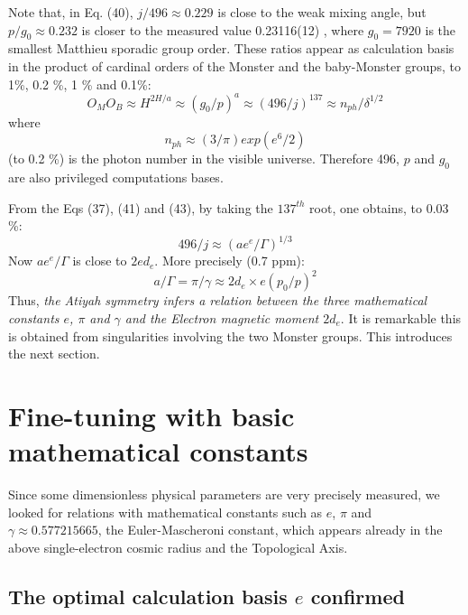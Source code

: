 \documentclass[twoside,draft]{article}
\begin{document}
\begin{sloppypar}
{Note that, in Eq. (40), $j/496 \approx 0.229$ is close to the weak mixing angle, but $p/g_0 \approx 0.232$ is closer to the measured value 0.23116(12) \cite{Tanabashi}, where $g_0 = 7920 $ is the smallest Matthieu sporadic group order. These ratios appear as calculation basis in the product of cardinal orders of the Monster and the baby-Monster groups, to 1\%, 0.2 \%, 1 \% and 0.1\%:
\begin{equation}
O_MO_B\approx H^{2H/a} \approx (g_0/p)^a \approx (496/j)^{137} \approx  n_{ph}/\delta^{1/2}
\end{equation}
where $$n_{ph}\approx (3/\pi) exp(e^6/2)$$ (to 0.2 \%) is the photon number in the visible universe. Therefore 496, $p$ and $g_0$ are also privileged computations bases. 

From the Eqs (37), (41) and (43), by taking the $137^{th}$ root, one obtains, to 0.03 \%: $$496/j \approx (ae^e/\Gamma)^{1/3}$$
Now $ae^e/\Gamma$ is close to $2ed_e$. More precisely (0.7 ppm):
\begin{equation}
a/\Gamma = \pi/\gamma \approx 2d_e \times e (p_0/p)^2 
\end{equation}
Thus, \textit{the Atiyah symmetry infers a relation between the three mathematical constants $e$, $\pi$ and $\gamma$ and the Electron magnetic moment $2d_e$}. It is remarkable this is obtained from singularities involving the two Monster groups. This introduces the next section.

\section{Fine-tuning with basic mathematical constants}

Since some dimensionless physical parameters are very precisely measured, we looked for
relations with mathematical constants such as $e$, $\pi$ and $\gamma \approx
0.577215665$, the Euler-Mascheroni constant, which appears already in the above single-electron
cosmic radius and the Topological Axis.

\subsection {The optimal calculation basis $e$ confirmed}

}
\end{sloppypar}
\end{document}
